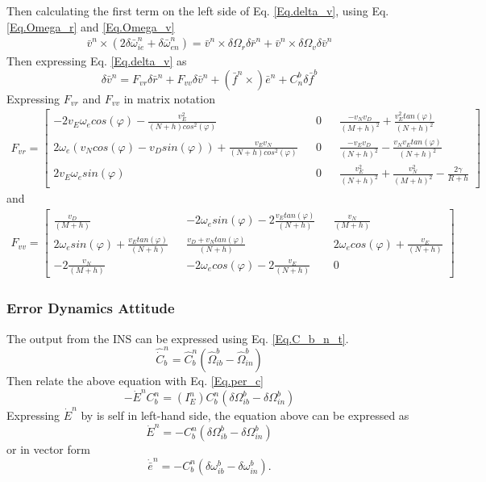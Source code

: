 Then calculating the first term on the left side of Eq. \eqref{Eq.delta_v}, using Eq. \eqref{Eq.Omega_r} and \eqref{Eq.Omega_v}
\begin{align}
\bar{v}^n\times(2\delta \bar{\omega}_{ie}^n+\delta \bar{\omega}_{en}^n) = 
\bar{v}^n \times \delta\Omega_r\delta\bar{r}^n +\bar{v}^n\times\delta\Omega_v\delta\bar{v}^n
\end{align}
Then expressing Eq. \eqref{Eq.delta_v} as
\begin{equation}
\delta\bar{v}^n = F_{vr}\delta\bar{r}^n + F_{vv}\delta\bar{v}^n + (\bar{f}^n	\times)\bar{e}^n + C_n^b\delta \bar{f}^b
\end{equation}
Expressing $F_{vr}$ and $F_{vv}$ in matrix notation
\begin{align}
F_{vr} = 
\begin{bmatrix}
-2v_E\omega_e cos(\varphi)-\frac{v_E^2}{(N+h)cos^2(\varphi)} && 0 && \frac{-v_N v_D}{(M+h)^2} + \frac{v_E^2 tan(\varphi)}{(N+h)^2} \\
2\omega_e(v_N cos(\varphi)-v_D sin(\varphi)) + \frac{v_Ev_N}{(N+h)cos^2(\varphi)} && 0 && \frac{-v_E v_D}{(N+h)^2} - \frac{v_Nv_E tan(\varphi)}{(N+h)^2} \\
2v_E\omega_e sin(\varphi) && 0 && \frac{v_E^2}{(N+h)^2} + \frac{v_N^2}{(M+h)^2} - \frac{2\gamma}{R+h}
\end{bmatrix}
\label{Eq.Fvr}
\end{align}
and
\begin{align}
F_{vv} = 
\begin{bmatrix}
\frac{v_D}{(M+h)} && -2\omega_e sin(\varphi) -2\frac{v_Etan(\varphi)}{(N+h)} && \frac{v_N}{(M+h)} \\
2\omega_e sin(\varphi) +\frac{v_E tan(\varphi)}{(N+h)} && \frac{v_D + v_N tan(\varphi)}{(N+h)} && 2\omega_e cos(\varphi)+ \frac{v_E}{(N+h)} \\
-2\frac{v_N}{(M+h)} && -2\omega_e cos(\varphi) -2\frac{v_E}{(N+h)} && 0
\end{bmatrix}
\label{Eq.Fvv}
\end{align}
\subsubsection{Error Dynamics Attitude}
The output from the INS can be expressed using Eq. \eqref{Eq.C_b_n_t}.
\begin{equation}
\hat{\dot{C}}_b^n = \hat{C}_b^n(\hat{\Omega}_{ib}^b - \hat{\Omega}_{in}^b)
\end{equation}
Then relate the above equation with Eq. \eqref{Eq.per_c}
\begin{equation}
-\dot{E}^nC_b^n = (I_E^n)C_b^n(\delta\Omega_{ib}^b-\delta\Omega_{in}^b)
\end{equation}
Expressing $\dot{E}^n$ by is self in left-hand side, the equation above can be expressed as
\begin{equation}
\dot{E}^n = -C_b^n(\delta\Omega_{ib}^b-\delta\Omega_{in}^b)
\end{equation}
or in vector form
\begin{equation}
\dot\bar{{e}}^n = -C_b^n(\delta\omega_{ib}^b-\delta\omega_{in}^b).
\label{Eq.error_vec}
\end{equation}

